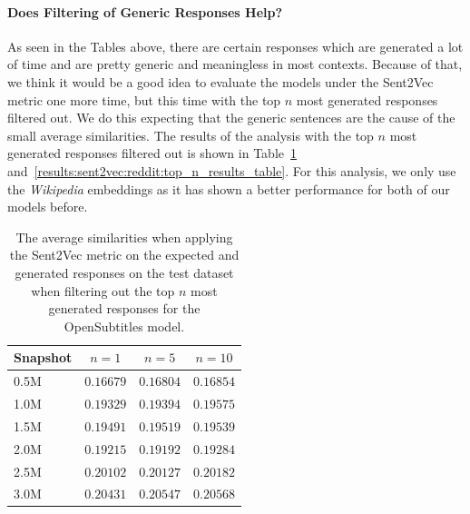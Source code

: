 \paragraph{Does Filtering of Generic Responses Help?} As seen in the Tables above, there are certain responses which are generated a lot of time and are pretty generic and meaningless in most contexts. Because of that, we think it would be a good idea to evaluate the models under the Sent2Vec metric one more time, but this time with the top $n$ most generated responses filtered out. We do this expecting that the generic sentences are the cause of the small average similarities. The results of the analysis with the top $n$ most generated responses filtered out is shown in Table~\ref{results:sent2vec:opensubtitles:top_n_results_table} and~\ref{results:sent2vec:reddit:top_n_results_table}. For this analysis, we only use the \emph{Wikipedia} embeddings as it has shown a better performance for both of our models before.
\\
\begin{table}[H]
	\centering
	\begin{adjustbox}{max width=\textwidth}
		\begin{tabular}{lccc}
			\toprule
			Snapshot & $n = 1$ & $n = 5$ & $n = 10$\\
			\midrule
			0.5M & $0.16679$ & $0.16804$ & $0.16854$\\
			1.0M & $0.19329$ & $0.19394$ & $0.19575$\\
			1.5M & $0.19491$ & $0.19519$ & $0.19539$\\
			2.0M & $0.19215$ & $0.19192$ & $0.19284$\\
			2.5M & $0.20102$ & $0.20127$ & $0.20182$\\
			3.0M & $0.20431$ & $0.20547$ & $0.20568$\\
			\bottomrule
		\end{tabular}
	\end{adjustbox}
	\caption{The average similarities when applying the Sent2Vec metric on the expected and generated responses on the test dataset when filtering out the top $n$ most generated responses for the OpenSubtitles model.}
	\label{results:sent2vec:opensubtitles:top_n_results_table}
\end{table}

